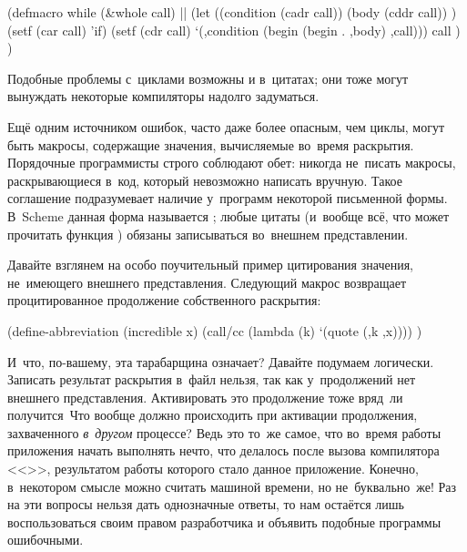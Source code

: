 \begin{code:lisp}
(defmacro while (&whole call)    |\dialect{\CommonLisp}|
  (let ((condition (cadr call))
        (body      (cddr call)) )
    (setf (car call) 'if)
    (setf (cdr call) `(,condition (begin (begin . ,body) ,call)))
    call ) )
\end{code:lisp}

Подобные проблемы с~циклами возможны и в~цитатах; они тоже могут вынуждать
некоторые компиляторы надолго задуматься. 

Ещё одним источником ошибок, часто даже более опасным, чем циклы, могут быть
макросы, содержащие значения, вычисляемые во~время раскрытия. Порядочные
программисты строго соблюдают обет: никогда не~писать макросы, раскрывающиеся
в~код, который невозможно написать вручную. Такое соглашение подразумевает
наличие у~программ некоторой письменной формы. В~Scheme данная форма называется
; любые цитаты (и~вообще всё, что может прочитать
функция ) обязаны записываться во~внешнем представлении.

Давайте взглянем на особо поучительный пример цитирования значения, не~имеющего
внешнего представления. Следующий макрос возвращает процитированное продолжение
собственного раскрытия:

\begin{code:lisp}
(define-abbreviation (incredible x)
  (call/cc (lambda (k) `(quote (,k ,x)))) )
\end{code:lisp}

И~что, по-вашему, эта тарабарщина означает? Давайте подумаем логически. Записать
результат раскрытия в~файл нельзя, так как у~продолжений нет внешнего
представления. Активировать это продолжение тоже вряд~ли получится\textdots\
Что вообще должно происходить при активации продолжения, захваченного
\emph{в~другом} процессе? Ведь это то~же самое, что во~время работы приложения
\ic{a.out} начать выполнять нечто, что делалось после вызова компилятора
<<\ic{cc~main.c}>>, результатом работы которого стало данное приложение.
Конечно, в~некотором смысле \ic{call/cc} можно считать машиной времени, но
не~буквально~же! Раз на эти вопросы нельзя дать однозначные ответы, то нам
остаётся лишь воспользоваться своим правом разработчика и объявить подобные
программы ошибочными.

